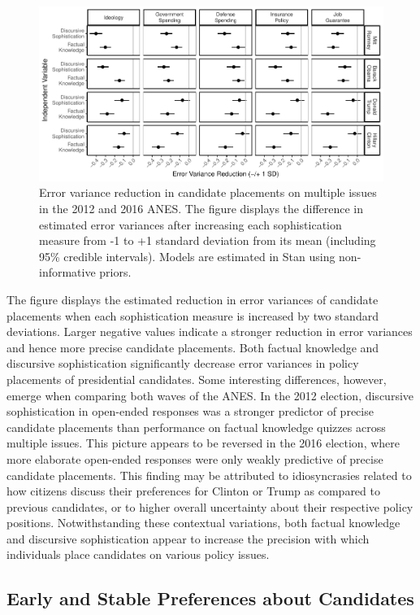 \documentclass[12pt]{article}
\begin{document}
\begin{figure}[h]\centering
\includegraphics{../fig/hetreg.pdf}
\caption{Error variance reduction in candidate placements on multiple issues in the 2012 and 2016 ANES. The figure displays the difference in estimated error variances after increasing each sophistication measure from -1 to +1 standard deviation from its mean (including 95\% credible intervals). Models are estimated in Stan using non-informative priors.}\label{fig:hetreg}
\end{figure}

The figure displays the estimated reduction in error variances of candidate placements when each sophistication measure is increased by two standard deviations. Larger negative values indicate a stronger reduction in error variances and hence more precise candidate placements. Both factual knowledge and discursive sophistication significantly decrease error variances in policy placements of presidential candidates. Some interesting differences, however, emerge when comparing both waves of the ANES. In the 2012 election, discursive sophistication in open-ended responses was a stronger predictor of precise candidate placements than performance on factual knowledge quizzes across multiple issues. This picture appears to be reversed in the 2016 election, where more elaborate open-ended responses were only weakly predictive of precise candidate placements. This finding may be attributed to idiosyncrasies related to how citizens discuss their preferences for Clinton or Trump as compared to previous candidates, or to higher overall uncertainty about their respective policy positions. Notwithstanding these contextual variations, both factual knowledge and discursive sophistication appear to increase the precision with which individuals place candidates on various policy issues.


\subsection*{Early and Stable Preferences about Candidates}
\end{document}
